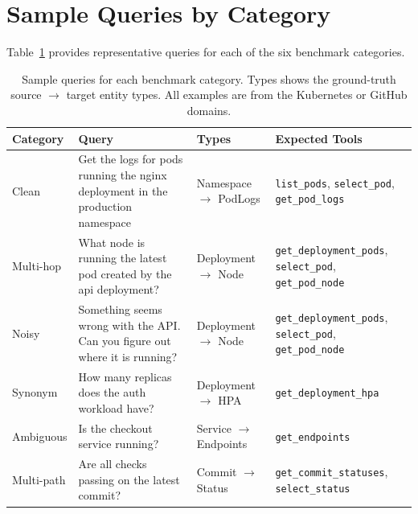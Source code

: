 \appendix

\section{Sample Queries by Category}
\label{sec:appendix-queries}

Table~\ref{tab:sample-queries} provides representative queries for each of the six benchmark categories.

\begin{table}[t]
\centering
\small
\begin{tabular}{l p{6.5cm} l l}
\toprule
\textbf{Category} & \textbf{Query} & \textbf{Types} & \textbf{Expected Tools} \\
\midrule
Clean & Get the logs for pods running the nginx deployment in the production namespace & Namespace $\rightarrow$ PodLogs & \texttt{list\_pods}, \texttt{select\_pod}, \texttt{get\_pod\_logs} \\
\addlinespace
Multi-hop & What node is running the latest pod created by the api deployment? & Deployment $\rightarrow$ Node & \texttt{get\_deployment\_pods}, \texttt{select\_pod}, \texttt{get\_pod\_node} \\
\addlinespace
Noisy & Something seems wrong with the API. Can you figure out where it is running? & Deployment $\rightarrow$ Node & \texttt{get\_deployment\_pods}, \texttt{select\_pod}, \texttt{get\_pod\_node} \\
\addlinespace
Synonym & How many replicas does the auth workload have? & Deployment $\rightarrow$ HPA & \texttt{get\_deployment\_hpa} \\
\addlinespace
Ambiguous & Is the checkout service running? & Service $\rightarrow$ Endpoints & \texttt{get\_endpoints} \\
\addlinespace
Multi-path & Are all checks passing on the latest commit? & Commit $\rightarrow$ Status & \texttt{get\_commit\_statuses}, \texttt{select\_status} \\
\bottomrule
\end{tabular}
\caption{Sample queries for each benchmark category. Types shows the ground-truth source $\rightarrow$ target entity types. All examples are from the Kubernetes or GitHub domains.}
\label{tab:sample-queries}
\end{table}
